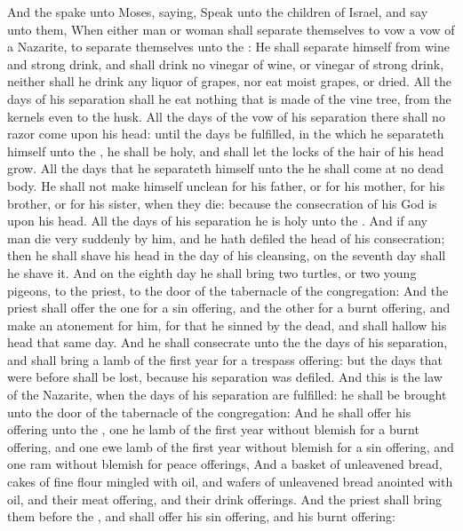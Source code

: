 \begin{biblechapter} %
 And the \LORD spake unto Moses, saying,
\verse Speak unto the children of Israel, and say unto them, When either man or woman shall separate themselves to vow a vow of a Nazarite, to separate themselves unto the \LORD:
\verse He shall separate himself from wine and strong drink, and shall drink no vinegar of wine, or vinegar of strong drink, neither shall he drink any liquor of grapes, nor eat moist grapes, or dried.
\verse All the days of his separation shall he eat nothing that is made of the vine tree, from the kernels even to the husk.
\verse All the days of the vow of his separation there shall no razor come upon his head: until the days be fulfilled, in the which he separateth himself unto the \LORD, he shall be holy, and shall let the locks of the hair of his head grow.
\verse All the days that he separateth himself unto the \LORD he shall come at no dead body.
\verse He shall not make himself unclean for his father, or for his mother, for his brother, or for his sister, when they die: because the consecration of his God is upon his head.
\verse All the days of his separation he is holy unto the \LORD.
\verse And if any man die very suddenly by him, and he hath defiled the head of his consecration; then he shall shave his head in the day of his cleansing, on the seventh day shall he shave it.
\verse And on the eighth day he shall bring two turtles, or two young pigeons, to the priest, to the door of the tabernacle of the congregation:
\verse And the priest shall offer the one for a sin offering, and the other for a burnt offering, and make an atonement for him, for that he sinned by the dead, and shall hallow his head that same day.
\verse And he shall consecrate unto the \LORD the days of his separation, and shall bring a lamb of the first year for a trespass offering: but the days that were before shall be lost, because his separation was defiled.
\verse And this is the law of the Nazarite, when the days of his separation are fulfilled: he shall be brought unto the door of the tabernacle of the congregation:
\verse And he shall offer his offering unto the \LORD, one he lamb of the first year without blemish for a burnt offering, and one ewe lamb of the first year without blemish for a sin offering, and one ram without blemish for peace offerings,
\verse And a basket of unleavened bread, cakes of fine flour mingled with oil, and wafers of unleavened bread anointed with oil, and their meat offering, and their drink offerings.
\verse And the priest shall bring them before the \LORD, and shall offer his sin offering, and his burnt offering:

\end{biblechapter}
